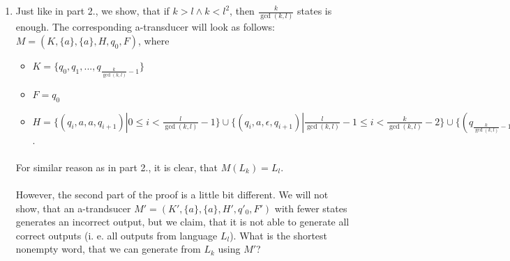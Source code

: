 \begin{enumerate}
\paragraph{}
It is easy to see, that the number of iterations of this cycle on a correct input (from $L_k$) is divisible by $\gcd(k,l)$. Each iteration creates $\frac{l}{\gcd(k,l)}$ symbols $a$ on the output, therefore $M(L_k) = L_l$.

\paragraph{}
Now we need to prove, that this number really forms a lower bound for state count: suppose, that there is an a-transducer $M' = (K, \{a\}, \{a\}, H, q_0, F)$ with at most $\frac{l}{\gcd(k,l)} -1$ states. Similarly to the proof of part 1., we look for a cycle, in this case of the length $\frac{l}{\gcd(k,l)} - 1$ states. With very similar series of arguments, we can construct two inputs $x' \equiv x.a^{k.r}$ and $x'' \equiv x.a^{2k.r}$, which produce outputs $y' \equiv y.a^{k.s}$ and $y'' \equiv y.a^{2k.s}$, respectively. If both of these numbers were divisible by $l$, then also $k.s$ would be divisible by $l$. However, this is not possible, since $s < \frac{l}{\gcd(k,l)}$ and as stated in Section 1 \color{red}(probably)\color{black}, $\lcm(k,l) = \frac{k.l}{\gcd(k,l)}$.  

\item Just like in part 2., we show, that if $k > l \land k < l^2$, then $\frac{k}{\gcd(k,l)}$ states is enough. The corresponding a-transducer will look as follows: $M = (K, \{ a\}, \{ a\}, H, q_0, F)$, where 

\begin{itemize}
\item $K = \{ q_0, q_1,  ..., q_{\frac{k}{\gcd(k,l)}-1 }\}$
\item $F = q_0$
\item $H = \{(q_i, a, a, q_{i+1})| 0 \leq i < \frac{l}{\gcd(k,l)}-1 \} \cup \{(q_i, a, \epsilon, q_{i+1})| \frac{l}{\gcd(k,l)}-1 \leq i < \frac{k}{\gcd(k,l)}-2 \} \cup \{ (q_{\frac{k}{\gcd(k,l)}-1}, \epsilon, a, q_0) \}$.
\end{itemize}
\paragraph{}
For similar reason as in part 2., it is clear, that $M(L_k) = L_l$.

\paragraph{}
However, the second part of the proof is a little bit different. We will not show, that an a-trandsucer $M' = (K', \{a\}, \{a\}, H', q'_0, F')$ with fewer states generates an incorrect output, but we claim, that it is not able to generate all correct outputs (i. e. all outputs from language $L_l$).
What is the shortest nonempty  word, that we can generate from $L_k$ using $M'$?


\end{enumerate}
